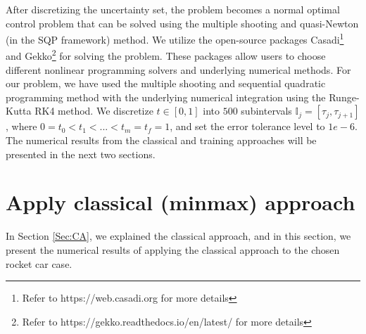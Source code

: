 \documentclass  [
  paper    = a4,
  BCOR     = 10mm,
  twoside,
  fontsize = 12pt,
  fleqn,
  toc      = bibnumbered,
  toc      = listofnumbered,
  numbers  = noendperiod,
  headings = normal,
  listof   = leveldown,
  version  = 3.03
]                                       {scrreprt}
\newcommand{\<}{\langle}
\renewcommand{\>}{\rangle}
\begin{document}
After discretizing the uncertainty set, the problem becomes a normal optimal control problem that can be solved using the multiple shooting and quasi-Newton (in the SQP framework) method. We utilize the open-source packages Casadi\footnote{Refer to https://web.casadi.org for more details} and Gekko\footnote{Refer to https://gekko.readthedocs.io/en/latest/ for more details} for solving the problem. These packages allow users to choose different nonlinear programming solvers and underlying numerical methods. For our problem, we have used the multiple shooting and sequential quadratic programming method with the underlying numerical integration using the Runge-Kutta RK4 method. We discretize $t \in [0,1]$ into $500$ subintervals $\mathbb{I}_j = [\tau_{j}, \tau_{j+1}]$, where $0 = t_0 < t_1 < ... < t_m = t_f =1$, and set the error tolerance level to $1e-6$. The numerical results from the classical and training approaches will be presented in the next two sections.


\section{Apply classical (minmax) approach}
In Section \ref{Sec:CA}, we explained the classical approach, and in this section, we present the numerical results of applying the classical approach to the chosen rocket car case.
\end{document}
